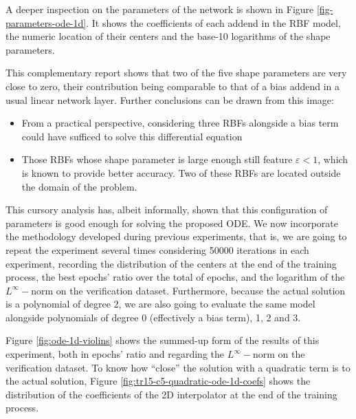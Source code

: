 \documentclass[12pt]{report} %
\begin{document}
A deeper inspection on the parameters of the network is shown in Figure \ref{fig-parameters-ode-1d}.
It shows the coefficients of each addend in the RBF model, the numeric location of
their centers and the base-10 logarithms of the shape parameters.

This complementary report shows that two of the five shape parameters are very close to zero,
their contribution being comparable to that of a bias addend in a usual linear network layer.
Further conclusions can be drawn from this image:
\begin{itemize}
  \item From a practical perspective, considering three
        RBFs alongside a bias term could have sufficed to solve this differential equation
  \item Those RBFs whose shape parameter is large enough still feature $\varepsilon<1$, which is
        known to provide better accuracy. Two of these RBFs are located outside the
        domain of the problem.
\end{itemize}

This cursory analysis has, albeit informally, shown that this configuration of parameters
is good enough for solving the proposed ODE. We now incorporate the
methodology developed during previous experiments, that is, we are going to repeat the experiment
several times considering 50000 iterations in each experiment,
recording the distribution of the centers at the end of the training
process, the best epochs' ratio over the total of epochs, and the logarithm of the $L^\infty-$norm
on the verification dataset. Furthermore,
because the actual solution is a polynomial
of degree 2, we are also going to evaluate the same model alongside polynomials of degree 0
(effectively a bias term), 1, 2 and 3. 

Figure \ref{fig:ode-1d-violins} shows the summed-up form of the results of this experiment, both in epochs' ratio and regarding the $L^\infty-$norm on the verification dataset. To know how ``close'' the solution with a quadratic term is to the actual solution, Figure \ref{fig:tr15-c5-quadratic-ode-1d-coefs} shows the distribution of the coefficients of the 2D interpolator at the end of the training process.
\end{document}

